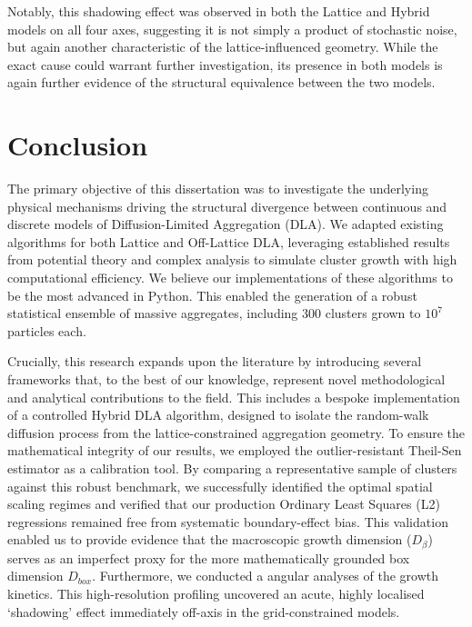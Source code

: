 \documentclass[12pt, a4paper, oneside]{report}
\theoremstyle{remark}
\begin{document}
Notably, this shadowing effect was observed in both the Lattice and Hybrid models on all four axes, suggesting it is not simply a product of stochastic noise, but again another characteristic of the lattice-influenced geometry. While the exact cause could warrant further investigation, its presence in both models is again further evidence of the structural equivalence between the two models. 

\chapter{Conclusion}
\label{ch:conclusion}
The primary objective of this dissertation was to investigate the underlying physical mechanisms driving the structural divergence between continuous and discrete models of Diffusion-Limited Aggregation (DLA). We adapted existing algorithms for both Lattice and Off-Lattice DLA, leveraging established results from potential theory and complex analysis to simulate cluster growth with high computational efficiency. We believe our implementations of these algorithms to be the most advanced in Python. This enabled the generation of a robust statistical ensemble of massive aggregates, including 300 clusters grown to $10^7$ particles each. 

Crucially, this research expands upon the literature by introducing several frameworks that, to the best of our knowledge, represent novel methodological and analytical contributions to the field. This includes a bespoke implementation of a controlled Hybrid DLA algorithm, designed to isolate the random-walk diffusion process from the lattice-constrained aggregation geometry. To ensure the mathematical integrity of our results, we employed the outlier-resistant Theil-Sen estimator as a calibration tool. By comparing a representative sample of clusters against this robust benchmark, we successfully identified the optimal spatial scaling regimes and verified that our production Ordinary Least Squares (L2) regressions remained free from systematic boundary-effect bias. This validation enabled us to provide evidence that the macroscopic growth dimension ($D_\beta$) serves as an imperfect proxy for the more mathematically grounded box dimension $D_{box}$. Furthermore, we conducted a angular analyses of the growth kinetics. This high-resolution profiling uncovered an acute, highly localised `shadowing' effect immediately off-axis in the grid-constrained models.
\end{document}
